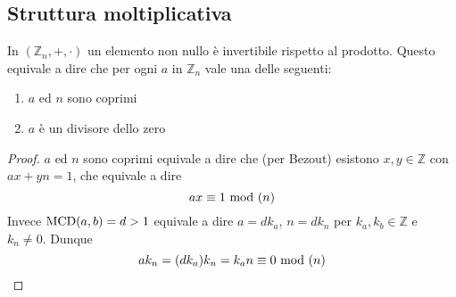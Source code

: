 \subsection{Struttura moltiplicativa}
\begin{proposizione}
	In $\left(\mathbb{Z}_n,+,\cdot\right)$ un elemento non nullo è invertibile rispetto al prodotto. Questo equivale a dire che per ogni $a$ in $\mathbb{Z}_n$ vale una delle seguenti:
	\begin{enumerate}
		\item $a$ ed $n$ sono coprimi
		\item $a$ è un divisore dello zero
	\end{enumerate}
\end{proposizione}
\begin{proof}
	$a$ ed $n$ sono coprimi equivale a dire che (per Bezout) esistono $x,y\in\mathbb{Z}$ con $ax+yn=1$, che equivale a dire
	\begin{equation*}
	ax\equiv1\ \mathrm{mod}\ (n)
	\end{equation*}
	Invece $\operatorname{\mathrm{MCD}}(a,b)=d>1$ equivale a dire $a=dk_a$, $n=dk_n$ per $k_a,k_b\in\mathbb{Z}$ e $k_n\neq0$. Dunque 
	\begin{equation*}
	ak_n=(dk_a)k_n=k_an\equiv0\ \mathrm{mod}\ (n)
	\end{equation*}
\end{proof}
